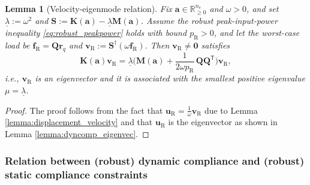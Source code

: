 \documentclass[preprint,3p]{elsarticle}
\newtheorem{lemma}{Lemma}
\newtheorem{remark}{Remark}
\newcommand{\T}{^{\mathsf T}}
\newcommand{\nel}{n_\mathrm{e}}
\newcommand{\R}{\mathrm{R}}
\numberwithin{equation}{section}
\begin{document}
\begin{lemma}[Velocity-eigenmode relation]\label{lemma:peakpower_eigenvec}
Fix $\mathbf{a}\in\mathbb R_{\ge0}^{\nel}$ and $\omega>0$, and set $\underline{\lambda}:=\omega^2$ and
$\mathbf{S}:=\mathbf{K}(\mathbf{a})-\underline{\lambda}\mathbf{M}(\mathbf{a})$.
Assume the robust peak-input-power inequality \eqref{eq:robust_peakpower} holds with bound $p_\R>0$,
and let the worst-case load be $\mathbf{f}_\R= \mathbf{Q} \mathbf{r}_{q}$ and
$\mathbf{v}_\R:=\mathbf{S}^\dagger(\omega\mathbf{f}_\R)$.
Then $\mathbf{v}_\R\neq \mathbf{0}$ satisfies
\[
\mathbf K(\mathbf{a})\mathbf{v}_\R
=\underline{\lambda}\Big(\mathbf{M}(\mathbf{a})+\frac{1}{2\omega p_\R}\,\mathbf{Q}\mathbf{Q}\T\Big)\mathbf{v}_\R,
\]
i.e., $\mathbf{v}_\R$ is an eigenvector and it is associated with the smallest positive eigenvalue $\mu=\underline{\lambda}$.
\end{lemma}
\begin{proof}
  The proof follows from the fact that $\mathbf{u}_\R = \frac{1}{\omega} \mathbf{v}_\R$ due to Lemma \ref{lemma:displacement_velocity} and that $\mathbf{u}_\R$ is the eigenvector as shown in Lemma \ref{lemma:dyncomp_eigenvec}.
\end{proof}


\subsubsection{Relation between (robust) dynamic compliance and (robust) static compliance constraints}
\end{document}
